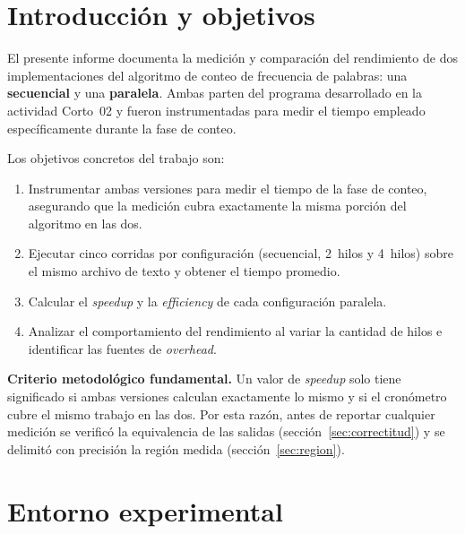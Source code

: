 \documentclass[11pt,letterpaper]{article}
\newcommand{\destacado}[2][azulcl]{%
  \begin{cajadest}[#1]\small #2\end{cajadest}}
\begin{document}
\tableofcontents
\thispagestyle{fancy}
\newpage

\section{Introducción y objetivos}

El presente informe documenta la medición y comparación del rendimiento de dos
implementaciones del algoritmo de conteo de frecuencia de palabras: una
\textbf{secuencial} y una \textbf{paralela}. Ambas parten del programa desarrollado
en la actividad Corto~02 y fueron instrumentadas para medir el tiempo empleado
específicamente durante la fase de conteo.

Los objetivos concretos del trabajo son:

\begin{enumerate}[label=\textbf{\arabic*.}]
  \item Instrumentar ambas versiones para medir el tiempo de la fase de conteo,
        asegurando que la medición cubra exactamente la misma porción del
        algoritmo en las dos.
  \item Ejecutar cinco corridas por configuración (secuencial, 2~hilos y
        4~hilos) sobre el mismo archivo de texto y obtener el tiempo promedio.
  \item Calcular el \emph{speedup} y la \emph{efficiency} de cada configuración
        paralela.
  \item Analizar el comportamiento del rendimiento al variar la cantidad de
        hilos e identificar las fuentes de \emph{overhead}.
\end{enumerate}

\destacado[verdeok]{\textbf{Criterio metodológico fundamental.} Un valor de
\emph{speedup} solo tiene significado si ambas versiones calculan exactamente lo
mismo y si el cronómetro cubre el mismo trabajo en las dos. Por esta razón, antes
de reportar cualquier medición se verificó la equivalencia de las salidas
(sección~\ref{sec:correctitud}) y se delimitó con precisión la región medida
(sección~\ref{sec:region}).}

\section{Entorno experimental}
\end{document}
